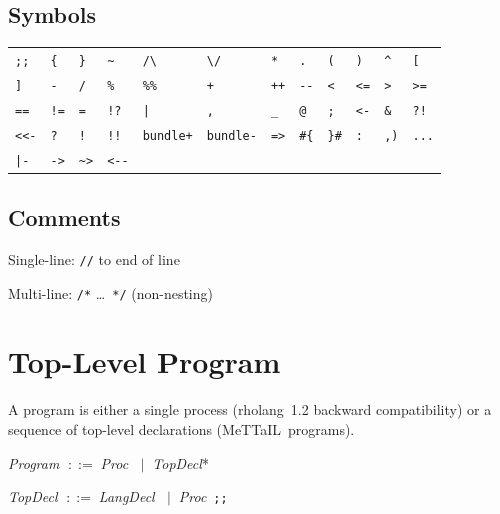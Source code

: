 \documentclass[11pt,a4paper]{article}
\newcommand{\sym}[1]{\texttt{#1}}                       %
\newcommand{\nt}[1]{\textit{\textcolor{nt}{#1}}}        %
\newcommand{\OR}{\ensuremath{\;\mid\;}}                  %
\newcommand{\bnfdef}{\ensuremath{\;::=\;}}               %
\newenvironment{grammar}{%
  \par\smallskip\begin{list}{}{%
    \setlength{\leftmargin}{1.5em}%
    \setlength{\itemsep}{2pt}%
    \setlength{\parsep}{0pt}}%
}{\end{list}\smallskip}
\begin{document}
\subsection{Symbols}

\medskip
\begin{tabular}{@{}llllllllllll@{}}
\sym{;;}  & \sym{\{} & \sym{\}} & \sym{\~{}} & \sym{/\textbackslash} & \sym{\textbackslash/}
  & \sym{*} & \sym{.} & \sym{(} & \sym{)} & \sym{\^{}} & \sym{[} \\
\sym{]}   & \sym{-}  & \sym{/}  & \sym{\%}   & \sym{\%\%}  & \sym{+}
  & \sym{++}& \sym{-{}-}& \sym{<} & \sym{<=} & \sym{>}   & \sym{>=} \\
\sym{==}  & \sym{!=} & \sym{=}  & \sym{!?}   & \sym{|}     & \sym{,}
  & \sym{\_}& \sym{@} & \sym{;}  & \sym{<-}  & \sym{\&}  & \sym{?!} \\
\sym{<<-} & \sym{?}  & \sym{!}  & \sym{!!}   & \sym{bundle+}& \sym{bundle-}
  & \sym{=>}& \sym{\#\{}& \sym{\}\#} & \sym{:} & \sym{,)}  & \sym{...} \\
\sym{|-}  & \sym{->} & \sym{\~{}>} & \sym{<-{}-} & & & & & & & & \\
\end{tabular}

\subsection{Comments}

\begin{grammar}
\item Single-line: \texttt{//} to end of line
\item Multi-line: \texttt{/*} \ldots\ \texttt{*/} (non-nesting)
\end{grammar}


\section{Top-Level Program}
\label{sec:toplevel}

A program is either a single process (rholang~1.2 backward compatibility)
or a sequence of top-level declarations (MeTTaIL~programs).

\begin{grammar}
\item \nt{Program} \bnfdef \nt{Proc} \OR \nt{TopDecl}*
\item \nt{TopDecl} \bnfdef \nt{LangDecl} \OR \nt{Proc}~\sym{;;}
\end{grammar}
\end{document}
